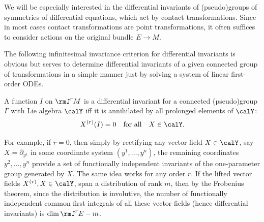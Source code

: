 We will be especially interested in the differential invariants of (pseudo)groups of symmetries of differential equations, which act by contact transformations. Since in most cases contact transformations are point transformations, it often suffices to consider actions on the original bundle $E\to M$.

The following infinitesimal invariance criterion for differential invariants is obvious but serves to determine differential invariants of a given connected group of transformations in a simple manner just by solving a system of linear first-order ODEs.

\begin{prop}
    A function $I$ on $\rmJ^r M$ is a differential invariant for a connected (pseudo)group $\Gamma$ with Lie algebra $\calY$ iff it is annihilated by all prolonged elements of $\calY$:
    \[X^{(r)}(I)=0\quad \text{for all}\quad X\in\calY.\]
\end{prop}

For example, if $r=0$, then simply by rectifying any vector field $X\in\calY$, say $X=\partial_{y^1}$ in some coordinate system $(y^1,\ldots,y^n)$, the remaining coordinates $y^2,\ldots,y^n$ provide a set of functionally independent invariants of the one-parameter group generated by $X$. The same idea works for any order $r$. If the lifted vector fields $X^{(r)},X\in\calY$, span a distribution of rank $m$, then by the Frobenius theorem, since the distribution is involutive, the number of functionally independent common first integrals of all these vector fields (hence differential invariants) is $\dim \rmJ^r E-m$.


